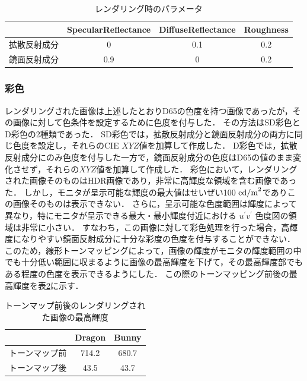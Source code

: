                 \begin{table}[h]
                    \centering
                    \caption{レンダリング時のパラメータ}
                    \begin{tabular}{|l||c|c|c|} \hline
                                               & SpecularReflectance & DiffuseReflectance & Roughness \\ \hline \hline
                        拡散反射成分           & 0                   & 0.1                & 0.2 \\ \hline
                        鏡面反射成分           & 0.9                 & 0                  & 0.2 \\ \hline
                    \end{tabular}
                    \label{render_param}
                \end{table}
            
            \subsubsection{彩色}
                レンダリングされた画像は上述したとおりD65の色度を持つ画像であったが，その画像に対して色条件を設定するために色度を付与した．
                その方法はSD彩色とD彩色の2種類であった．
                SD彩色では，拡散反射成分と鏡面反射成分の両方に同じ色度を設定し，それらのCIE $XYZ$値を加算して作成した．
                D彩色では，拡散反射成分にのみ色度を付与した一方で，鏡面反射成分の色度はD65の値のまま変化させず，それらの$XYZ$値を加算して作成した．
                彩色において，レンダリングされた画像そのものはHDR画像であり，非常に高輝度な領域を含む画像であった．
                しかし，モニタが呈示可能な輝度の最大値はせいぜい100 ${\rm cd/m}^2$でありこの画像そのものは表示できない．
                さらに，呈示可能な色度範囲は輝度によって異なり，特にモニタが呈示できる最大・最小輝度付近における $u^{\prime}v^{\prime}$ 色度図の領域は非常に小さい．
                すなわち，この画像に対して彩色処理を行った場合，高輝度になりやすい鏡面反射成分に十分な彩度の色度を付与することができない．
                このため，線形トーンマッピングによって，画像の輝度がモニタの輝度範囲の中でも十分低い範囲に収まるように画像の最高輝度を下げて，その最高輝度部でもある程度の色度を表示できるようにした．
                この際のトーンマッピング前後の最高輝度を表\ref{tonemap}に示す．

                \begin{table}[h]
                    \centering
                    \caption{トーンマップ前後のレンダリングされた画像の最高輝度}
                    \begin{tabular}{|l||c|c|} \hline
                                               & Dragon              & Bunny              \\ \hline \hline
                        トーンマップ前         & 714.2            & 680.7           \\ \hline
                        トーンマップ後         & 43.5             & 43.7            \\ \hline
                    \end{tabular}
                    \label{tonemap}
                \end{table}

